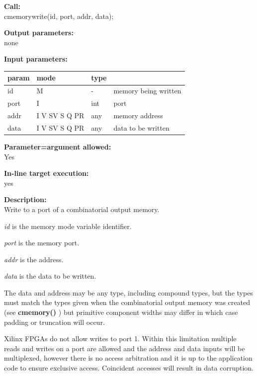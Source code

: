         {\bf Call:} \\
        cmemorywrite(id, port, addr, data);
        
        {\bf Output parameters:} \\
        none
        
        {\bf Input parameters:} \\
        \begin{tabular}{| l | l | l | l |}
        \hline
        param  & mode     & type  & \\
        \hline \hline
        id   & M             &  -  & memory being written   \\ \hline
        port & I             & int & port                   \\ \hline
        addr & I V SV S Q PR & any & memory address         \\ \hline
        data & I V SV S Q PR & any & data to be written     \\ \hline
        \end{tabular}
        
        {\bf Parameter=argument allowed:} \\
        Yes
        
        {\bf In-line target execution:} \\
        yes
        
        {\bf Description:} \\
        Write to a port of a combinatorial output memory.

        {\em id} is the memory mode variable identifier.

        {\em port} is the memory port.

        {\em addr} is the address.

        {\em data} is the data to be written.
        
        The data and address may be any type, including compound types, but the
        types must match the types given when the combinatorial output memory was
        created (see {\bf cmemory()} ) but primitive
        component widths may differ in which case padding or truncation will occur.

        Xilinx FPGAs do not allow writes to port 1. Within this limitation
        multiple reads and writes on a port are allowed and the address and
        data inputs will be multiplexed, however there is no access arbitration
        and it is up to the application code to ensure exclusive access.
        Coincident accesses will result in data corruption.


